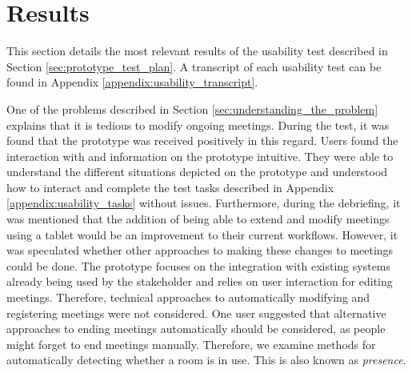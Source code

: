 \section{Results}\label{sec:usability_evaluation_results}
This section details the most relevant results of the usability test described in Section \ref{sec:prototype_test_plan}.
A transcript of each usability test can be found in Appendix \ref{appendix:usability_transcript}.

One of the problems described in Section \ref{sec:understanding_the_problem} explains that it is tedious to modify ongoing meetings. 
During the test, it was found that the prototype was received positively in this regard. 
Users found the interaction with and information on the prototype intuitive. 
They were able to understand the different situations depicted on the prototype and understood how to interact and complete the test tasks described in Appendix \ref{appendix:usability_tasks} without issues. 
Furthermore, during the debriefing, it was mentioned that the addition of being able to extend and modify meetings using a tablet would be an improvement to their current workflows.
However, it was speculated whether other approaches to making these changes to meetings could be done. 
The prototype focuses on the integration with existing systems already being used by the stakeholder and relies on user interaction for editing meetings. 
Therefore, technical approaches to automatically modifying and registering meetings were not considered. 
One user suggested that alternative approaches to ending meetings automatically should be considered, as people might forget to end meetings manually.
Therefore, we examine methods for automatically detecting whether a room is in use.
This is also known as \textit{presence}.